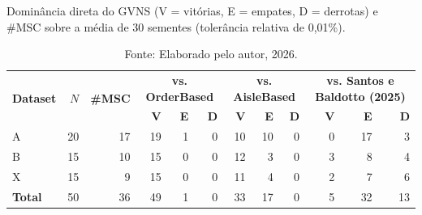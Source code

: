 \begin{table}[htbp]
  \centering
  \caption{\label{tab:dominancia} Dominância direta do GVNS (V = vitórias, E = empates, D = derrotas) e \#MSC sobre a média de 30 sementes (tolerância relativa de 0,01\%).}
  \begin{tabular}{l r r r r r r r r r r r}
    \toprule
    \multirow{2}{*}{\textbf{Dataset}} & \multirow{2}{*}{\textbf{$N$}} & \multirow{2}{*}{\textbf{\#MSC}} & \multicolumn{3}{c}{\textbf{vs. OrderBased}} & \multicolumn{3}{c}{\textbf{vs. AisleBased}} & \multicolumn{3}{c}{\textbf{vs. Santos e Baldotto (2025)}} \\
    \cmidrule(lr){4-6} \cmidrule(lr){7-9} \cmidrule(lr){10-12}
    & & & \textbf{V} & \textbf{E} & \textbf{D} & \textbf{V} & \textbf{E} & \textbf{D} & \textbf{V} & \textbf{E} & \textbf{D} \\
    \midrule
    A & 20 & 17 & 19 & 1 & 0 & 10 & 10 & 0 & 0 & 17 & 3 \\
    B & 15 & 10 & 15 & 0 & 0 & 12 & 3 & 0 & 3 & 8 & 4 \\
    X & 15 & 9 & 15 & 0 & 0 & 11 & 4 & 0 & 2 & 7 & 6 \\
    \midrule
    \textbf{Total} & 50 & 36 & 49 & 1 & 0 & 33 & 17 & 0 & 5 & 32 & 13 \\
    \bottomrule
  \end{tabular}
  \caption*{\footnotesize Fonte: Elaborado pelo autor, 2026.}
\end{table}
